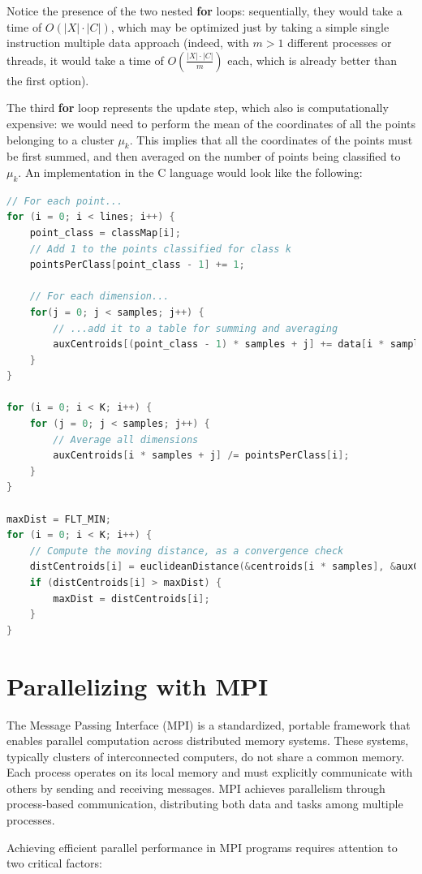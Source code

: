 \documentclass[11pt, journal]{IEEEtran}
\newcommand{\nwl}{

\vspace{11pt}

}
\begin{document}
Notice the presence of the two nested \textbf{for} loops: sequentially, they would take a time of $O(|X| \cdot |C|)$, which may be optimized just by taking a simple single instruction multiple data approach (indeed, with $m > 1$ different processes or threads, it would take a time of $O\left(\frac{|X| \cdot |C|}{m}\right)$ each, which is already better than the first option).
\nwl
The third \textbf{for} loop represents the update step, which also is computationally expensive: we would need to perform the mean of the coordinates of all the points belonging to a cluster $\mu_k$. This implies that all the coordinates of the points must be first summed, and then averaged on the number of points being classified to $\mu_k$. An implementation in the C language would look like the following:
\nwl
\begin{lstlisting}[language = C]
// For each point...
for (i = 0; i < lines; i++) {
    point_class = classMap[i];
    // Add 1 to the points classified for class k
    pointsPerClass[point_class - 1] += 1;

    // For each dimension...
    for(j = 0; j < samples; j++) {
        // ...add it to a table for summing and averaging
        auxCentroids[(point_class - 1) * samples + j] += data[i * samples + j];
    }
}

for (i = 0; i < K; i++) {
    for (j = 0; j < samples; j++) {
        // Average all dimensions
        auxCentroids[i * samples + j] /= pointsPerClass[i];
    }
}

maxDist = FLT_MIN;
for (i = 0; i < K; i++) {
    // Compute the moving distance, as a convergence check
    distCentroids[i] = euclideanDistance(&centroids[i * samples], &auxCentroids[i * samples], samples);
    if (distCentroids[i] > maxDist) {
        maxDist = distCentroids[i];
    }
}\end{lstlisting}

\section{Parallelizing with MPI}

The Message Passing Interface (MPI) is a standardized, portable framework that enables parallel computation across distributed memory systems. These systems, typically clusters of interconnected computers, do not share a common memory. Each process operates on its local memory and must explicitly communicate with others by sending and receiving messages. MPI achieves parallelism through process-based communication, distributing both data and tasks among multiple processes.
\nwl
Achieving efficient parallel performance in MPI programs requires attention to two critical factors:
\end{document}
